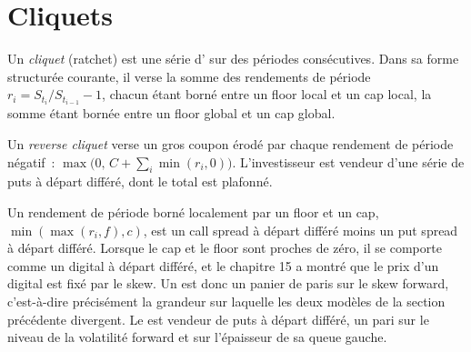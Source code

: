 \section{Cliquets}

\begin{definition}[Cliquet]\label{def:dv:asians-lookbacks-cliquets-and-forward-starts:cliquet}
Un \emph{cliquet} (ratchet) est une série d' sur des périodes consécutives. Dans sa forme structurée
courante, il verse la somme des rendements de période $r_i=S_{t_i}/S_{t_{i-1}}-1$, chacun étant borné entre un floor local
et un cap local, la somme étant bornée entre un floor global et un cap global.
\end{definition}

\begin{definition}\label{def:dv:asians-lookbacks-cliquets-and-forward-starts:reverse}
Un \emph{reverse cliquet} verse un gros coupon érodé par chaque rendement de période négatif~:
$\max\bigl(0,\,C+\sum_i\min(r_i,0)\bigr)$. L'investisseur est vendeur d'une série de puts à départ différé, dont le total est plafonné.
\end{definition}

Un rendement de période borné localement par un floor et un cap, $\min(\max(r_i,f),c)$, est un call spread à départ différé moins un put
spread à départ différé. Lorsque le cap et le floor sont proches de zéro, il se comporte comme un digital à départ différé, et le chapitre 15 a montré que
le prix d'un digital est fixé par le skew. Un  est donc un panier de paris sur le skew forward, c'est-à-dire précisément la
grandeur sur laquelle les deux modèles de la section précédente divergent. Le  est vendeur de puts à départ différé, un pari sur le
niveau de la volatilité forward et sur l'épaisseur de sa queue gauche.

